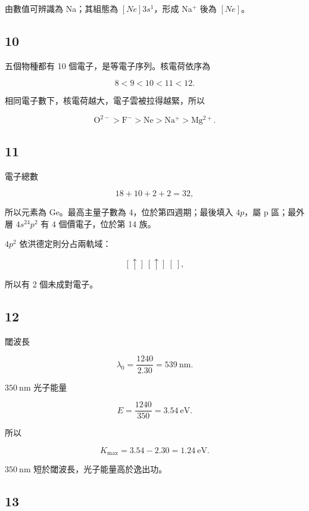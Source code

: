 \documentclass[11pt,a4paper]{article}
\begin{document}
由數值可辨識為 Na；其組態為 \([Ne]3s^1\)，形成 Na\(^+\) 後為 \([Ne]\)。

\subsection{10}\label{section-9}

五個物種都有 10 個電子，是等電子序列。核電荷依序為

\[
8<9<10<11<12.
\]

相同電子數下，核電荷越大，電子雲被拉得越緊，所以

\[
\mathrm{O^{2-}>F^->Ne>Na^+>Mg^{2+}}.
\]

\subsection{11}\label{section-10}

電子總數

\[
18+10+2+2=32,
\]

所以元素為 Ge。最高主量子數為 4，位於第四週期；最後填入 \(4p\)，屬 p 區；最外層 \(4s^24p^2\) 有 4 個價電子，位於第 14 族。

\(4p^2\) 依洪德定則分占兩軌域：

\[
[\uparrow]\ [\uparrow]\ [\ ],
\]

所以有 2 個未成對電子。

\subsection{12}\label{section-11}

閾波長

\[
\lambda_0=\frac{1240}{2.30}=539\ \mathrm{nm}.
\]

\(350\ \mathrm{nm}\) 光子能量

\[
E=\frac{1240}{350}=3.54\ \mathrm{eV}.
\]

所以

\[
K_{\max}=3.54-2.30=1.24\ \mathrm{eV}.
\]

\(350\ \mathrm{nm}\) 短於閾波長，光子能量高於逸出功。

\subsection{13}\label{section-12}
\end{document}
